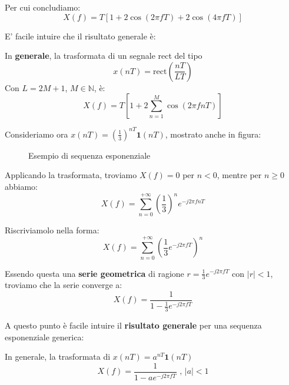 Per cui concludiamo:
\[
    X(f) = T\left[ 1 + 2\cos(2\pi fT) + 2\cos(4\pi fT)  \right]
\]

E' facile intuire che il risultato generale è:

\begin{prop}
    In \textbf{generale}, la trasformata di un segnale rect del tipo
    \[
        x(nT) = \text{rect} \left( \frac{nT}{LT} \right)
    \] 
    Con $L=2M+1$, $M\in \mathbb{N}$, è:
    \[
        X(f) = T \left[ 1 + 2 \sum_{n=1}^M \cos(2\pi fnT) \right]
    \] 
\end{prop}

Consideriamo ora $x(nT) = \left( \frac{1}{3} \right)^{nT} \mathbf{1}(nT)$, mostrato
anche in figura:

\begin{figure}[!ht]
    \centering
    \caption{Esempio di sequenza esponenziale}
\end{figure}

Applicando la trasformata, troviamo $X(f)=0$ per $n<0$, mentre per $n\ge 0$ abbiamo:
\[
    X(f) = \sum_{n=0}^{+\infty} \left( \frac{1}{3} \right)^n e^{-j 2\pi fnT}
\]

Riscriviamolo nella forma:
\[
    X(f) = \sum_{n=0}^{+\infty} \left( \frac{1}{3} e^{-j 2\pi fT} \right)^n
\]

Essendo questa una \textbf{serie geometrica} di ragione $r=\frac{1}{3} e^{-j 2\pi fT}$ 
con $|r|<1$, troviamo che la serie converge a:
\[
    X(f) = \frac{1}{1 - \frac{1}{3}e^{-j 2\pi fT} }
\]

A questo punto è facile intuire il \textbf{risultato generale} per 
una sequenza esponenziale generica:

\begin{prop}
    In generale, la trasformata di $x(nT) = a^{nT} \mathbf{1}(nT)$
    \[
        X(f) = \frac{1}{1 - ae^{-j 2\pi fT} } \text{ , }|a|<1
    \] 
\end{prop}
